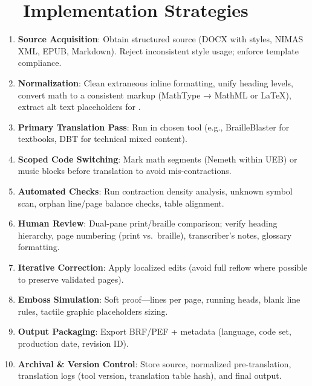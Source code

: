 \section{~~Implementation Strategies}
\label{sec:braille-implementation}
\begin{enumerate}
	\item \textbf{Source Acquisition}: Obtain structured source (DOCX with styles, NIMAS XML, EPUB, Markdown). Reject inconsistent style usage; enforce template compliance.
	\item \textbf{Normalization}: Clean extraneous inline formatting, unify heading levels, convert math to a consistent markup (MathType → MathML or LaTeX), extract alt text placeholders for .
	\item \textbf{Primary Translation Pass}: Run in chosen tool (e.g., BrailleBlaster for textbooks, DBT for technical mixed content).
	\item \textbf{Scoped Code Switching}: Mark math segments (Nemeth within UEB) or music blocks before translation to avoid mis-contractions.
	\item \textbf{Automated Checks}: Run contraction density analysis, unknown symbol scan, orphan line/page balance checks, table alignment.
	\item \textbf{Human Review}: Dual-pane print/braille comparison; verify heading hierarchy, page numbering (print vs.\ braille), transcriber’s notes, glossary formatting.
	\item \textbf{Iterative Correction}: Apply localized edits (avoid full reflow where possible to preserve validated pages).
	\item \textbf{Emboss Simulation}: Soft proof—lines per page, running heads, blank line rules, tactile graphic placeholders sizing.
	\item \textbf{Output Packaging}: Export BRF/PEF + metadata (language, code set, production date, revision ID).
	\item \textbf{Archival \& Version Control}: Store source, normalized pre-translation, translation logs (tool version, translation table hash), and final output.
\end{enumerate}


